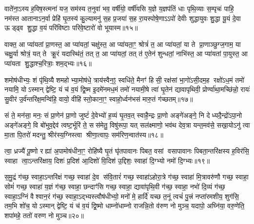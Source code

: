 वाते॑ना॒ऽस्य ह॒विष॒स्त्मना॑ यज॒ सम॑स्य त॒नुवा॑ भव॒ वर्\mbox{}षी॑यो॒ वर्\mbox{}षी॑यसि य॒ज्ञे य॒ज्ञप॑तिं धाः पृथि॒व्याः स॒म्पृचः॑ पाहि॒ नम॑स्त आतानाऽन॒र्वा प्रेहि॑ घृ॒तस्य॑ कु॒ल्यामनु॑ स॒ह प्र॒जया॑ स॒ह रा॒यस्पोषे॒णाऽऽपो॑ देवीः शुद्धायुवः शु॒द्धा यू॒यं दे॒वा ऊड्ढ्व शु॒द्धा व॒यं परि॑विष्टाः परिवे॒ष्टारो॑ वो भूयास्म॥१५॥

{\anuvakamend[{दे॒वेन॒ चतु॑श्चत्वारिशच्च॥८॥}]}

वाक्त॒ आ प्या॑यतां प्रा॒णस्त॒ आ प्या॑यतां॒ चक्षु॑स्त॒ आ प्या॑यता॒ꣳ॒ श्रोत्रं॑ त॒ आ प्या॑यतां॒ या ते प्रा॒णाञ्छुग्ज॒गाम॒ या चक्षु॒र्या श्रोत्रं॒ यत् ते क्रू॒रं यदास्थि॑तं॒ तत् त॒ आ प्या॑यतां॒ तत् त॑ ए॒तेन॑ शुन्धतां॒ नाभि॑स्त॒ आ प्या॑यतां पा॒युस्त॒ आ प्या॑यता शु॒द्धाश्च॒रित्राः॒ शम॒द्भ्यः॥१६॥

शमोष॑धीभ्यः॒ शं पृ॑थि॒व्यै शमहोभ्या॒मोष॑धे॒ त्राय॑स्वैन॒ꣵ॒ स्वधि॑ते॒ मैनꣳ॑ हिसी॒ रक्ष॑सां भा॒गो॑ऽसी॒दम॒ह रक्षो॑ऽध॒मं तमो॑ नयामि॒ योऽस्मान् द्वेष्टि॒ यं च॑ व॒यं द्वि॒ष्म इ॒दमे॑नमध॒मं तमो॑ नयामी॒षे त्वा॑ घृ॒तेन॑ द्यावापृथिवी॒ प्रोर्ण्वा॑था॒मच्छि॑न्नो॒ रायः॑ सु॒वीर॑ उ॒र्व॑न्तरि॑क्ष॒मन्वि॑हि॒ वायो॒ वीहि॑ स्तो॒काना॒ꣳ॒ स्वाहो॒र्ध्वन॑भसं मारु॒तं ग॑च्छतम्॥१७॥

{\anuvakamend[{अ॒द्भ्यो वीहि॒ पञ्च॑ च॥९॥}]}

सं ते॒ मन॑सा॒ मनः॒ सं प्रा॒णेन॑ प्रा॒णो जुष्टं॑ दे॒वेभ्यो॑ ह॒व्यं घृ॒तव॒त् स्वाहै॒न्द्रः प्रा॒णो अङ्गे॑अङ्गे॒ नि देध्यदै॒न्द्रो॑ऽपा॒नो अङ्गे॑अङ्गे॒ वि बो॑भुव॒द्देव॑ त्वष्ट॒र्भूरि॑ ते॒ सस॑मेतु॒ विषु॑रूपा॒ यत् सल॑क्ष्माणो॒ भव॑थ देव॒त्रा यन्त॒मव॑से॒ सखा॒योऽनु॑ त्वा मा॒ता पि॒तरो॑ मदन्तु॒ श्रीर॑स्य॒ग्निस्त्वा श्रीणा॒त्वापः॒ सम॑रिण॒न्वात॑स्य॥१८॥

त्वा॒ ध्रज्यै॑ पू॒ष्णो रह्या॑ अ॒पामोष॑धीना॒ꣳ॒ रोहि॑ष्यै घृ॒तं घृ॑तपावानः पिबत॒ वसां वसापावानः पिबता॒न्तरि॑क्षस्य ह॒विर॑सि॒ स्वाहा त्वा॒ऽन्तरि॑क्षाय॒ दिशः॑ प्र॒दिश॑ आ॒दिशो॑ वि॒दिश॑ उ॒द्दिशः॒ स्वाहा॑ दि॒ग्भ्यो नमो॑ दि॒ग्भ्यः॥१९॥

{\anuvakamend[{वात॑स्या॒ष्टाविꣳ॑शतिश्च॥10॥}]}

स॒मु॒द्रं ग॑च्छ॒ स्वाहा॒ऽन्तरि॑क्षं गच्छ॒ स्वाहा॑ दे॒व स॑वि॒तारं॑ गच्छ॒ स्वाहा॑ऽहोरा॒त्रे ग॑च्छ॒ स्वाहा॑ मि॒त्रावरु॑णौ गच्छ॒ स्वाहा॒ सोमं॑ गच्छ॒ स्वाहा॑ य॒ज्ञं ग॑च्छ॒ स्वाहा॒ छन्दाꣳ॑सि गच्छ॒ स्वाहा॒ द्यावा॑पृथि॒वी ग॑च्छ॒ स्वाहा॒ नभो॑ दि॒व्यं ग॑च्छ॒ स्वाहा॒ऽग्निं वैश्वान॒रं ग॑च्छ॒ स्वाहा॒ऽद्भ्यस्त्वौष॑धीभ्यो॒ मनो॑ मे॒ हार्दि॑ यच्छ त॒नूं त्वचं॑ पु॒त्त्रं नप्ता॑रमशीय॒ शुग॑सि॒ तम॒भि शो॑च॒ योऽस्मान् द्वेष्टि॒ यं च॑ व॒यं द्वि॒ष्मो धाम्नो॑धाम्नो राजन्नि॒तो व॑रुण नो मुञ्च॒ यदापो॒ अघ्नि॑या॒ वरु॒णेति॒ शपा॑महे॒ ततो॑ वरुण नो मुञ्च॥२०॥

